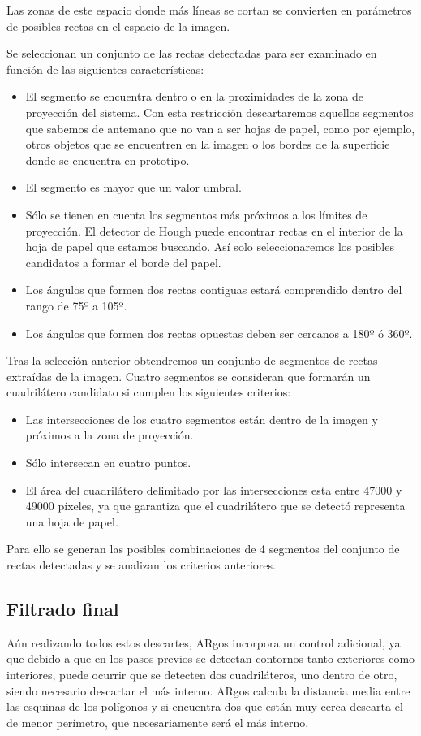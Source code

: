 Las zonas de este espacio donde más líneas se cortan se convierten en parámetros de posibles rectas
en el espacio de la imagen.

Se seleccionan un conjunto de las rectas detectadas para ser examinado en función de las siguientes características:

\begin{itemize}
\item El segmento se encuentra dentro o en la proximidades de la zona de proyección del
  sistema. Con esta restricción descartaremos aquellos segmentos que sabemos de antemano que no van
  a ser hojas de papel, como por ejemplo, otros objetos que se encuentren en la imagen o los bordes
  de la superficie donde se encuentra en prototipo.
\item El segmento es mayor que un valor umbral.
\item Sólo se tienen en cuenta los segmentos más próximos a los límites de proyección. El detector
  de Hough puede encontrar rectas en el interior de la hoja de papel que estamos buscando. Así solo
  seleccionaremos los posibles candidatos a formar el borde del papel.
\item Los ángulos que formen dos rectas contiguas estará comprendido dentro del rango de 75º a 105º.
\item Los ángulos que formen dos rectas opuestas deben ser cercanos a 180º ó 360º.
\end{itemize}

Tras la selección anterior obtendremos un conjunto de segmentos de rectas extraídas de la
imagen. Cuatro segmentos se consideran que formarán un cuadrilátero candidato si cumplen los
siguientes criterios:
\begin{itemize}
\item Las intersecciones de los cuatro segmentos están dentro de la imagen y próximos a la zona de
  proyección.
\item Sólo intersecan en cuatro puntos.
\item El área del cuadrilátero delimitado por las intersecciones esta entre 47000 y 49000 píxeles,
  ya que garantiza que el cuadrilátero que se detectó representa una hoja de papel.
\end{itemize}

Para ello se generan las posibles combinaciones de 4 segmentos del conjunto de rectas detectadas y
se analizan los criterios anteriores.

\subsection{Filtrado final}
Aún realizando todos estos descartes, ARgos incorpora un control adicional, ya que debido a que en
los pasos previos se detectan contornos tanto exteriores como interiores, puede ocurrir que se
detecten dos cuadriláteros, uno dentro de otro, siendo necesario descartar el más interno.
ARgos calcula la distancia media entre las esquinas de los polígonos y si encuentra dos que están
muy cerca descarta el de menor perímetro, que necesariamente será el más interno.

